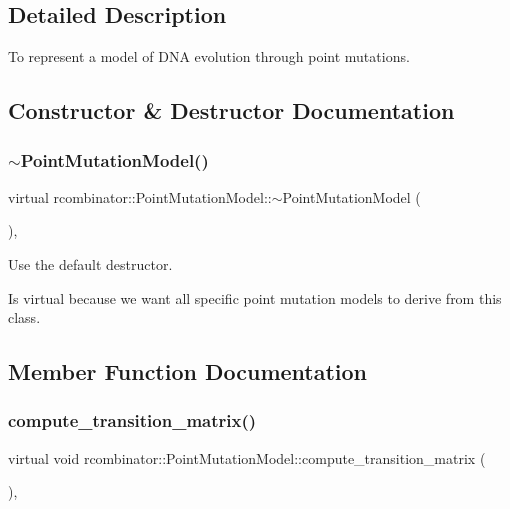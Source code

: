 \subsection{Detailed Description}
To represent a model of D\+NA evolution through point mutations. 

\subsection{Constructor \& Destructor Documentation}
\mbox{\label{classrcombinator_1_1PointMutationModel_a8e21c6b161e6c42d593bdffb3265d701}} 
\subsubsection{\texorpdfstring{$\sim$\+Point\+Mutation\+Model()}{~PointMutationModel()}}
{\footnotesize\ttfamily virtual rcombinator\+::\+Point\+Mutation\+Model\+::$\sim$\+Point\+Mutation\+Model (\begin{DoxyParamCaption}{ }\end{DoxyParamCaption})\hspace{0.3cm}{\ttfamily [virtual]}, {\ttfamily [default]}}



Use the default destructor. 

Is virtual because we want all specific point mutation models to derive from this class. 

\subsection{Member Function Documentation}
\mbox{\label{classrcombinator_1_1PointMutationModel_a2c09d4382b77a3b0e3d9d097a679075d}} 
\subsubsection{\texorpdfstring{compute\+\_\+transition\+\_\+matrix()}{compute\_transition\_matrix()}}
{\footnotesize\ttfamily virtual void rcombinator\+::\+Point\+Mutation\+Model\+::compute\+\_\+transition\+\_\+matrix (\begin{DoxyParamCaption}{ }\end{DoxyParamCaption})\hspace{0.3cm}{\ttfamily [protected]}, {}}



